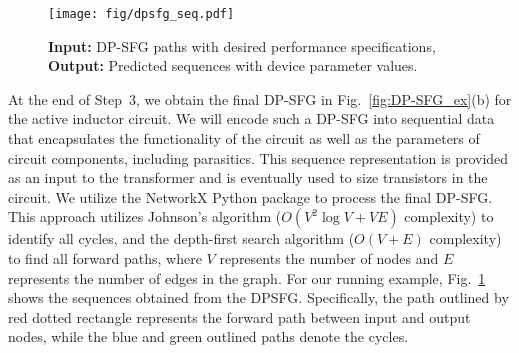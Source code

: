 \begin{figure}[t]
  \centering
  \texttt{[image: fig/dpsfg\_seq.pdf]} %
  \caption{\textbf{Input:} DP-SFG paths with desired performance specifications, \textbf{Output:} Predicted sequences with device parameter values.}
  \label{fig:seq}
  \vspace{-0.4cm}
\end{figure}

At the end of Step~3, we obtain the final DP-SFG in Fig.~\ref{fig:DP-SFG_ex}(b) for the active inductor circuit. We will encode such a DP-SFG into sequential data that encapsulates the functionality of the circuit as well as the parameters of circuit components, including parasitics. This sequence representation is provided as an input to the transformer and is eventually used to size transistors in the circuit. We utilize the NetworkX Python package to process the final DP-SFG. This approach utilizes Johnson's algorithm ($O(V^2 \log V + VE)$ complexity) to identify all cycles, and the depth-first search algorithm ($O(V + E)$ complexity) to find all forward paths, where $V$ represents the number of nodes and $E$ represents the number of edges in the graph. 
For our running example, Fig.~\ref{fig:seq} shows the sequences obtained from the DPSFG. Specifically, the path outlined by red dotted rectangle represents the forward path between input and output nodes, while the blue and green outlined paths denote the cycles.

















